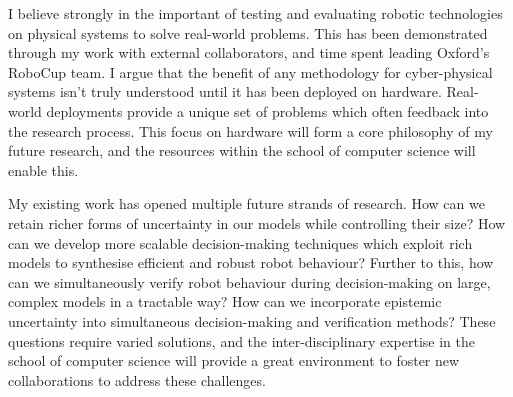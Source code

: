 \documentclass[11pt]{article}
\begin{document}
I believe strongly in the important of testing and evaluating robotic technologies on physical systems to solve real-world problems.
%
This has been demonstrated through my work with external collaborators, and time spent leading Oxford's RoboCup team.
%
I argue that the benefit of any methodology for cyber-physical systems isn't truly understood until it has been deployed on hardware.
%
Real-world deployments provide a unique set of problems which often feedback into the research process.
%
This focus on hardware will form a core philosophy of my future research, and the resources within the school of computer science will enable this.



My existing work has opened multiple future strands of research.
%
How can we retain richer forms of uncertainty in our models while controlling their size?
%
How can we develop more scalable decision-making techniques which exploit rich models to synthesise efficient and robust robot behaviour?
%
Further to this, how can we simultaneously verify robot behaviour during decision-making on large, complex models in a tractable way?
%
How can we incorporate epistemic uncertainty into simultaneous decision-making and verification methods?
%
These questions require varied solutions, and the inter-disciplinary expertise in the school of computer science will provide a great environment to foster new collaborations to address these challenges.
\end{document}
